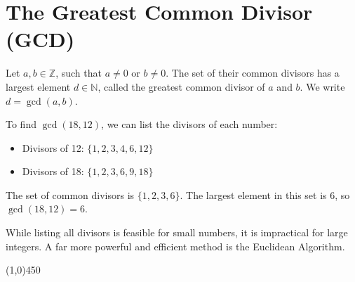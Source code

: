 \section{The Greatest Common Divisor (GCD)}

\begin{definition}
Let $a, b \in \mathbb{Z}$, such that $a \neq 0$ or $b \neq 0$. The set of their common divisors has a largest element $d \in \mathbb{N}$, called the greatest common divisor of $a$ and $b$. We write $d = \gcd(a, b)$.
\end{definition}

\bigskip

\begin{remark}
To find $\gcd(18, 12)$, we can list the divisors of each number:
\begin{itemize}
    \item Divisors of 12: $\{1, 2, 3, 4, 6, 12\}$
    \item Divisors of 18: $\{1, 2, 3, 6, 9, 18\}$
\end{itemize}
The set of common divisors is $\{1, 2, 3, 6\}$. The largest element in this set is $6$, so $\gcd(18, 12) = 6$.
\par
While listing all divisors is feasible for small numbers, it is impractical for large integers. A far more powerful and efficient method is the Euclidean Algorithm.
\end{remark}

\begin{center}
    \line(1,0){450}
\end{center}
